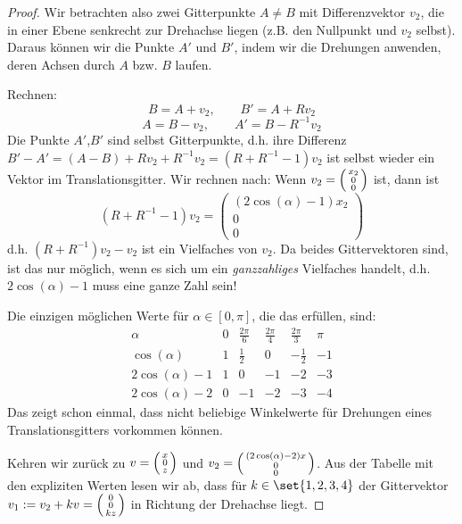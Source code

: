 \begin{proof}
\medbreak
Wir betrachten also zwei Gitterpunkte $A\neq B$ mit Differenzvektor $v_2$, die in einer  Ebene senkrecht zur Drehachse liegen (z.B. den Nullpunkt und $v_2$ selbst). Daraus können wir die Punkte $A'$ und $B'$, indem wir die Drehungen anwenden, deren Achsen durch $A$ bzw. $B$ laufen.

Rechnen:
\[B=A+v_2, \qquad B'=A+Rv_2\]
\[A=B-v_2, \qquad A'=B-R^{-1}v_2\]
Die Punkte $A'$,$B'$ sind selbst Gitterpunkte, d.h. ihre Differenz $B'-A'=(A-B)+Rv_2+R^{-1}v_2=(R+R^{-1}-1)v_2$ ist selbst wieder ein Vektor im Translationsgitter. Wir rechnen nach: Wenn $v_2=\begin{psmallmatrix}x_2\\0\\0\end{psmallmatrix}$ ist, dann ist
\[(R+R^{-1}-1)v_2 = \begin{pmatrix}(2\cos(\alpha)-1)x_2\\0\\0\end{pmatrix}\]
d.h. $(R+R^{-1})v_2-v_2$ ist ein Vielfaches von $v_2$. Da beides Gittervektoren sind, ist das nur möglich, wenn es sich um ein \emph{ganzzahliges} Vielfaches handelt, d.h. $2\cos(\alpha)-1$ muss eine ganze Zahl sein!

Die einzigen möglichen Werte für $\alpha\in[0,\pi]$, die das erfüllen, sind:
\[\begin{array}{c|ccccc}
\alpha & 0 & \frac{2\pi}{6} & \frac{2\pi}{4} & \frac{2\pi}{3} & \pi \\
\hline
\cos(\alpha) & 1 & \frac{1}{2} & 0 & -\frac{1}{2} & -1 \\
2\cos(\alpha)-1 & 1 & 0 & -1 & -2 & -3 \\
2\cos(\alpha)-2 & 0 & -1 & -2 & -3 & -4
\end{array}\]
Das zeigt schon einmal, dass nicht beliebige Winkelwerte für Drehungen eines Translationsgitters vorkommen können.

\medbreak
Kehren wir zurück zu $v=\begin{psmallmatrix}x\\0\\z\end{psmallmatrix}$ und $v_2=\begin{psmallmatrix}(2\cos(\alpha)-2)x\\0\\0\end{psmallmatrix}$. Aus der Tabelle mit den expliziten Werten lesen wir ab, dass für $k\in\set{1,2,3,4}$ der Gittervektor $v_1:=v_2+kv=\begin{psmallmatrix}0\\0\\kz\end{psmallmatrix}$ in Richtung der Drehachse liegt.
\end{proof}

